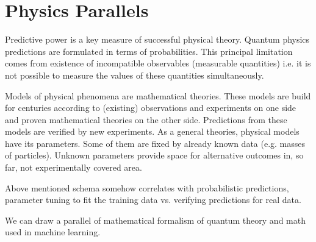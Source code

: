 \documentclass[12pt]{article}
\begin{document}
\section{Physics Parallels}

Predictive power is a key measure of successful physical theory. Quantum physics predictions are formulated in terms of
probabilities. This principal limitation comes from existence of incompatible observables
(measurable quantities) i.e. it is not possible to measure the values of these quantities simultaneously.

Models of physical phenomena are mathematical theories. These models are build for centuries according to
(existing) observations and experiments on one side and proven mathematical theories on the other side.
Predictions from these models are verified by new experiments. As a general theories, physical models have its parameters.
Some of them are fixed by already known data (e.g. masses of particles). Unknown parameters provide space for
alternative outcomes in, so far, not experimentally covered area.

Above mentioned schema somehow correlates with probabilistic predictions, parameter tuning to fit the training data
vs. verifying predictions for real data.

We can draw a parallel of mathematical formalism of quantum theory and math used in machine learning.
\end{document}
